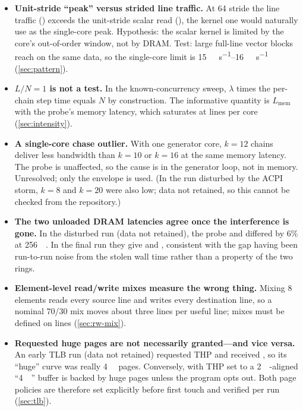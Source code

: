 \begin{itemize}
        iteration depending on where the compiler placed it, so some builds read half the clock. The probe
        now uses a 32-byte-aligned loop of eight dependent ADDs.
  \item \textbf{Unit-stride ``peak'' versus strided line traffic.} At \qty{64}{\byte} stride the line
        traffic () exceeds the unit-stride scalar
        read (), the kernel one would naturally use as the
        single-core peak. Hypothesis: the scalar kernel is limited by the core's out-of-order window, not by
        DRAM. Test: large full-line vector blocks reach  on
        the same data, so the single-core limit is \qtyrange{15}{16}{\gibi\byte\per\second}
        (\cref{sec:pattern}).
  \item \textbf{$L/N=1$ is not a test.} In the known-concurrency sweep, $\lambda$ times the per-chain step
        time equals $N$ by construction. The informative quantity is $L_{\text{mem}}$ with the probe's
        memory latency, which saturates at  lines per core (\cref{sec:intensity}).
  \item \textbf{A single-core chase outlier.} With one generator core, $k=12$ chains deliver less bandwidth
        than $k=10$ or $k=16$ at the same memory latency. The probe is unaffected, so the cause is in the
        generator loop, not in memory. Unresolved; only the envelope is used. (In the run disturbed by the
        ACPI storm, $k=8$ and $k=20$ were also low; data not retained, so this cannot be checked from the
        repository.)
  \item \textbf{The two unloaded DRAM latencies agree once the interference is gone.} In the disturbed run
        (data not retained), the  probe and  differed by 6\% at
        \qty{256}{\mebi\byte}. In the
        final run they give  and , consistent with the gap
        having been run-to-run noise from the stolen wall time rather than a property of the two rings.
  \item \textbf{Element-level read/write mixes measure the wrong thing.} Mixing \qty{8}{\byte} elements
        reads every source line and writes every destination line, so a nominal 70/30 mix moves about three
        lines per useful line; mixes must be defined on lines (\cref{sec:rw-mix}).
  \item \textbf{Requested huge pages are not necessarily granted---and vice versa.} An early TLB run (data not
        retained) requested THP and received , so its ``huge'' curve was really
        \qty{4}{\kibi\byte} pages. Conversely, with THP set to \sysHugePages{} a
        \qty{2}{\mebi\byte}-aligned ``\qty{4}{\kibi\byte}'' buffer is backed by huge pages unless the program
        opts out. Both page policies are therefore set explicitly before first touch and verified per run
        (\cref{sec:tlb}).
\end{itemize}

